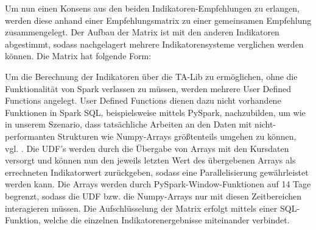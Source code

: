 

Um nun einen Konsens aus den beiden Indikatoren-Empfehlungen zu erlangen, werden diese anhand einer Empfehlungsmatrix zu einer gemeinsamen Empfehlung zusammengelegt. Der Aufbau der Matrix ist mit den anderen Indikatoren abgestimmt, sodass nachgelagert mehrere Indikatorensysteme verglichen werden können. Die Matrix hat folgende Form: \\


\begin{table}[h] 
	\caption{Empfehlungs-Matrix}
	\label{Empfehlungs-Matrix}
\end{table}


Um die Berechnung der Indikatoren über die TA-Lib zu ermöglichen, ohne die Funktionalität von Spark verlassen zu müssen, werden mehrere User Defined Functions angelegt. User Defined Functions dienen dazu nicht vorhandene Funktionen in Spark SQL, beispielsweise mittels PySpark, nachzubilden, um wie in unserem Szenario, dass tatsächliche Arbeiten an den Daten mit nicht-performanten Strukturen wie Numpy-Arrays größtenteils umgehen zu können, vgl. \cite{beg17}. Die UDF’s werden durch die Übergabe von Arrays mit den Kursdaten versorgt und können nun den jeweils letzten Wert des übergebenen Arrays als errechneten Indikatorwert zurückgeben, sodass eine Parallelisierung gewährleistet werden kann. Die Arrays werden durch PySpark-Window-Funktionen auf 14 Tage begrenzt, sodass die UDF bzw. die Numpy-Arrays nur mit diesen Zeitbereichen interagieren müssen. Die Aufschlüsselung der Matrix erfolgt mittels einer SQL-Funktion, welche die einzelnen Indikatorenergebnisse miteinander verbindet.\\

